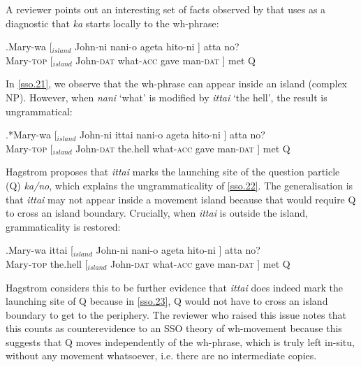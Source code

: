 \documentclass{glossa}
\begin{document}
A reviewer points out an interesting set of facts observed by \cite{pesetsky:1987} that \cite{hagstrom:1998} uses as a diagnostic that \textit{ka} starts locally to the wh-phrase:

\exg.\label{sso.21}Mary-wa [$_{island}$ John-ni nani-o ageta hito-ni ] atta no?\\
   Mary-\textsc{top} [$_{island}$ John-\textsc{dat} what-\textsc{acc} gave man-\textsc{dat} ] met Q\\

In \ref{sso.21}, we observe that the wh-phrase can appear inside an island (complex NP). However, when \textit{nani} `what' is modified by \textit{ittai} `the hell', the result is ungrammatical:

\exg.*\label{sso.22}Mary-wa [$_{island}$ John-ni ittai nani-o ageta hito-ni ] atta no?\\
   Mary-\textsc{top} [$_{island}$ John-\textsc{dat} the.hell what-\textsc{acc} gave man-\textsc{dat} ] met Q\\

Hagstrom proposes that \textit{ittai} marks the launching site of the question particle (Q) \textit{ka/no}, which explains the ungrammaticality of \ref{sso.22}. The generalisation is that \textit{ittai} may not appear inside a movement island because that would require Q to cross an island boundary. Crucially, when \textit{ittai} is outside the island, grammaticality is restored:

\exg.\label{sso.23}Mary-wa ittai [$_{island}$ John-ni nani-o ageta hito-ni ] atta no?\\
   Mary-\textsc{top} the.hell [$_{island}$ John-\textsc{dat} what-\textsc{acc} gave man-\textsc{dat} ] met Q\\

Hagstrom considers this to be further evidence that \textit{ittai} does indeed mark the launching site of Q because in \ref{sso.23}, Q would not have to cross an island boundary to get to the periphery. The reviewer who raised this issue notes that this counts as counterevidence to an SSO theory of wh-movement because this suggests that Q moves independently of the wh-phrase, which is truly left in-situ, without any movement whatsoever, i.e. there are no intermediate copies.
\end{document}
